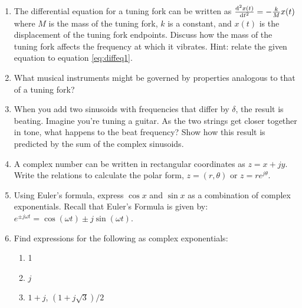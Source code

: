 \begin{enumerate}
\item The differential equation for a tuning fork can be written as $\frac{\mathrm{d}^{2} x(t)}{\mathrm{d} t^{2}} = -\frac{k}{M} x(t) $ where $M$ is the mass of the tuning fork, $k$ is a constant, and $x(t)$ is the displacement of the tuning fork endpoints. Discuss how the mass of the tuning fork affects the frequency at which it vibrates. Hint: relate the given equation to equation \ref{eq:diffeq1}.
\item What musical instruments might be governed by properties
  analogous to that of a tuning fork? 
\item When you add two sinusoids with frequencies that differ by
  $\delta$, the result is beating. Imagine you're tuning a guitar.  As
  the two strings get closer together in tone, what happens to the
  beat frequency? Show how this result is predicted by the sum of the
  complex sinusoids.
\item A complex number can be written in rectangular coordinates as $z
  = x + j y$. Write the relations to calculate the polar form, $z=(r,
  \theta)$ or $z = r e^{j\theta}$.
\item Using Euler's formula, express $\cos x$ and $\sin x$ as a
  combination of complex exponentials. Recall that Euler's Formula is given by: $e^{\pm j\omega t}=\cos(\omega t) \pm j \sin(\omega t)$.
\item Find expressions for the following as complex exponentials:
	\begin{enumerate}
	\item1 
	\item $j$
	\item $1 + j$, $(1 + j\sqrt{3})/2$
	\end{enumerate}


\end{enumerate}
